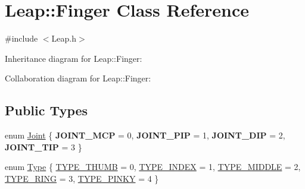 \hypertarget{class_leap_1_1_finger}{}\section{Leap\+:\+:Finger Class Reference}
\label{class_leap_1_1_finger}


{\ttfamily \#include $<$Leap.\+h$>$}



Inheritance diagram for Leap\+:\+:Finger\+:


Collaboration diagram for Leap\+:\+:Finger\+:
\subsection*{Public Types}
\begin{DoxyCompactItemize}
\item 
enum \hyperlink{class_leap_1_1_finger_ac49e756a0440cb5b75a9ad7838f08137}{Joint} \{ {\bfseries J\+O\+I\+N\+T\+\_\+\+M\+CP} = 0, 
{\bfseries J\+O\+I\+N\+T\+\_\+\+P\+IP} = 1, 
{\bfseries J\+O\+I\+N\+T\+\_\+\+D\+IP} = 2, 
{\bfseries J\+O\+I\+N\+T\+\_\+\+T\+IP} = 3
 \}
\item 
enum \hyperlink{class_leap_1_1_finger_a1e94681e6d2168b2f854fcad7c8ac483}{Type} \{ \newline
\hyperlink{class_leap_1_1_finger_a1e94681e6d2168b2f854fcad7c8ac483a35bc2239c4fd03e7a7bc4a1796ff5369}{T\+Y\+P\+E\+\_\+\+T\+H\+U\+MB} = 0, 
\hyperlink{class_leap_1_1_finger_a1e94681e6d2168b2f854fcad7c8ac483a65b574719317f125da20e9ba297510a2}{T\+Y\+P\+E\+\_\+\+I\+N\+D\+EX} = 1, 
\hyperlink{class_leap_1_1_finger_a1e94681e6d2168b2f854fcad7c8ac483aa36099c9c5f567dff6e8f7225046e1e3}{T\+Y\+P\+E\+\_\+\+M\+I\+D\+D\+LE} = 2, 
\hyperlink{class_leap_1_1_finger_a1e94681e6d2168b2f854fcad7c8ac483af7dac3433734b7b30fe2176f8ab9712b}{T\+Y\+P\+E\+\_\+\+R\+I\+NG} = 3, 
\newline
\hyperlink{class_leap_1_1_finger_a1e94681e6d2168b2f854fcad7c8ac483a44d0034d17dfd2494075891249397ee8}{T\+Y\+P\+E\+\_\+\+P\+I\+N\+KY} = 4
 \}
\end{DoxyCompactItemize}
